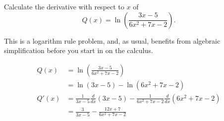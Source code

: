 \documentclass{ximera}
\author{Emma Smith Zbarsky}
\begin{document}
\begin{exercise}

Calculate the derivative with respect to $x$ of
\[Q(x) = \ln\left(\frac{3x-5}{6x^2+7x-2}\right).\]


\begin{hint}
This is a logarithm rule problem, and, as usual, benefits from algebraic
simplification before you start in on the calculus.
\end{hint}


\begin{hint}
\begin{align*}
Q(x) &= \ln\left(\frac{3x-5}{6x^2+7x-2}\right) \\
&= \ln(3x-5)-\ln(6x^2+7x-2) \\
Q'(x) &= \frac{1}{3x-5}\frac{d}{dx}(3x-5) - \frac{1}{6x^2+7x-2}\frac{d}{dx}\left(6x^2+7x-2\right) \\
&=\frac{3}{3x-5} - \frac{12x+7}{6x^2+7x-2}
\end{align*}
\end{hint}


\begin{multipleChoice}
\end{multipleChoice}

\end{exercise}
\end{document}
